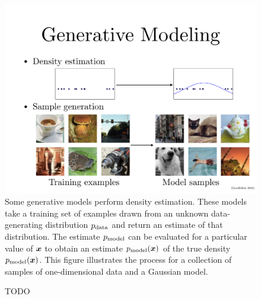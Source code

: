 \begin{figure}
\center
\includegraphics[width=\textwidth]{density.pdf}
\caption{Some generative models perform density estimation.
These models take a training set of examples drawn from an unknown
data-generating distribution $p_{\rm{data}}$ and return an estimate of that
distribution. The estimate $p_{\rm{model}}$ can be evaluated for a particular
value of ${\bm{x}}$ to obtain an estimate $p_{\rm{model}}({\bm{x}})$ of the true
density $p_{\rm{model}}({\bm{x}})$.
This figure illustrates the process for a collection of samples of
one-dimensional data and a Gaussian model.
}
\label{fig:density}
\end{figure}

\begin{figure}
  \center
  \caption{TODO
  }
  \label{fig:generative_machine}
\end{figure}

